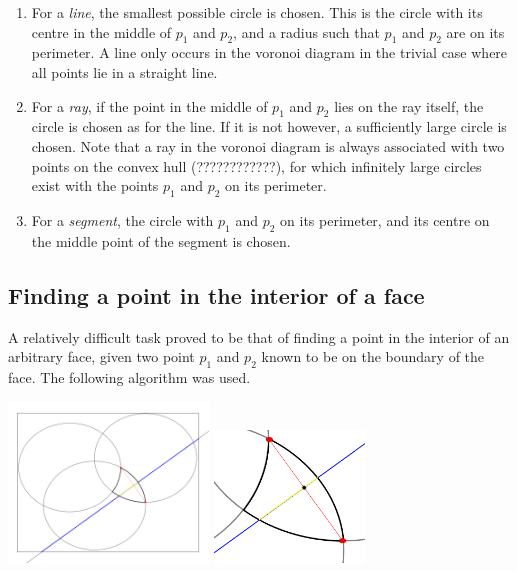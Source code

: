 \documentclass[a4paper,12pt]{article}
\begin{document}
\begin{enumerate}
\item
For a \emph{line}, the smallest possible circle is chosen. This is the circle with its centre in the middle of $p_1$ and $p_2$, and a radius such that $p_1$ and $p_2$ are on its perimeter. A line only occurs in the voronoi diagram in the trivial case where all points lie in a straight line.
\item
For a \emph{ray}, if the point in the middle of $p_1$ and $p_2$ lies on the ray itself, the circle is chosen as for the line. If it is not however, a sufficiently large circle is chosen. Note that a ray in the voronoi diagram is always associated with two points on the convex hull (????????????), for which infinitely large circles exist with the points $p_1$ and $p_2$ on its perimeter.
\item
For a \emph{segment}, the circle with $p_1$ and $p_2$ on its perimeter, and its centre on the middle point of the segment is chosen.
\end{enumerate}

\subsection{Finding a point in the interior of a face}
A relatively difficult task proved to be that of finding a point in the interior of an arbitrary face, given two point $p_1$ and $p_2$ known to be on the boundary of the face. The following algorithm was used.

\includegraphics[width=0.4\textwidth]{pictures/PointInFace.png}
\includegraphics[width=0.3\textwidth]{pictures/PointInFace2.png}
\end{document}
